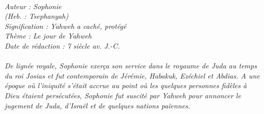 \BFont
\noindent\hrulefill
{\footnotesize
\textit{
\bigskip
{\centering{}
\\Auteur : Sophonie
\\(Heb. : Tsephanyah)
\\Signification : Yahweh a caché, protégé
\\Thème : Le jour de Yahweh
\\Date de rédaction : 7 siècle av. J.-C.\\}
}
\textit{
\\De lignée royale, Sophonie exerça son service dans le royaume de Juda au temps du roi Josias et fut contemporain de Jérémie, Habakuk, Ezéchiel et Abdias. A une époque où l'iniquité s'était accrue au point où les quelques personnes fidèles à Dieu étaient persécutées, Sophonie fut suscité par Yahweh pour annoncer le jugement de Juda, d'Israël et de quelques nations païennes.\bigskip
}
}
\par\nobreak\noindent\hrulefill

